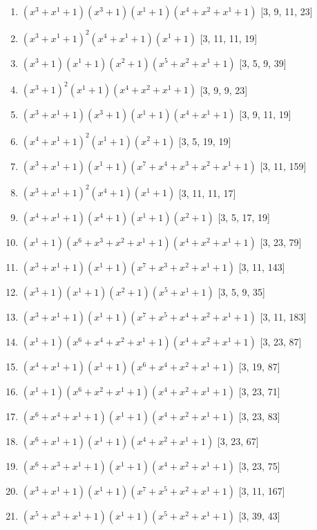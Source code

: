 \documentclass[10pt,twocolumn]{article}
\begin{document}
\begin{enumerate}
\item $(x^{3} + x^{1} + 1)(x^{3} + 1)(x^{1} + 1)(x^{4} + x^{2} + x^{1} + 1)$  [3, 9, 11, 23]
\item $(x^{3} + x^{1} + 1)^{2}(x^{4} + x^{1} + 1)(x^{1} + 1)$  [3, 11, 11, 19]
\item $(x^{3} + 1)(x^{1} + 1)(x^{2} + 1)(x^{5} + x^{2} + x^{1} + 1)$  [3, 5, 9, 39]
\item $(x^{3} + 1)^{2}(x^{1} + 1)(x^{4} + x^{2} + x^{1} + 1)$  [3, 9, 9, 23]
\item $(x^{3} + x^{1} + 1)(x^{3} + 1)(x^{1} + 1)(x^{4} + x^{1} + 1)$  [3, 9, 11, 19]
\item $(x^{4} + x^{1} + 1)^{2}(x^{1} + 1)(x^{2} + 1)$  [3, 5, 19, 19]
\item $(x^{3} + x^{1} + 1)(x^{1} + 1)(x^{7} + x^{4} + x^{3} + x^{2} + x^{1} + 1)$  [3, 11, 159]
\item $(x^{3} + x^{1} + 1)^{2}(x^{4} + 1)(x^{1} + 1)$  [3, 11, 11, 17]
\item $(x^{4} + x^{1} + 1)(x^{4} + 1)(x^{1} + 1)(x^{2} + 1)$  [3, 5, 17, 19]
\item $(x^{1} + 1)(x^{6} + x^{3} + x^{2} + x^{1} + 1)(x^{4} + x^{2} + x^{1} + 1)$  [3, 23, 79]
\item $(x^{3} + x^{1} + 1)(x^{1} + 1)(x^{7} + x^{3} + x^{2} + x^{1} + 1)$  [3, 11, 143]
\item $(x^{3} + 1)(x^{1} + 1)(x^{2} + 1)(x^{5} + x^{1} + 1)$  [3, 5, 9, 35]
\item $(x^{3} + x^{1} + 1)(x^{1} + 1)(x^{7} + x^{5} + x^{4} + x^{2} + x^{1} + 1)$  [3, 11, 183]
\item $(x^{1} + 1)(x^{6} + x^{4} + x^{2} + x^{1} + 1)(x^{4} + x^{2} + x^{1} + 1)$  [3, 23, 87]
\item $(x^{4} + x^{1} + 1)(x^{1} + 1)(x^{6} + x^{4} + x^{2} + x^{1} + 1)$  [3, 19, 87]
\item $(x^{1} + 1)(x^{6} + x^{2} + x^{1} + 1)(x^{4} + x^{2} + x^{1} + 1)$  [3, 23, 71]
\item $(x^{6} + x^{4} + x^{1} + 1)(x^{1} + 1)(x^{4} + x^{2} + x^{1} + 1)$  [3, 23, 83]
\item $(x^{6} + x^{1} + 1)(x^{1} + 1)(x^{4} + x^{2} + x^{1} + 1)$  [3, 23, 67]
\item $(x^{6} + x^{3} + x^{1} + 1)(x^{1} + 1)(x^{4} + x^{2} + x^{1} + 1)$  [3, 23, 75]
\item $(x^{3} + x^{1} + 1)(x^{1} + 1)(x^{7} + x^{5} + x^{2} + x^{1} + 1)$  [3, 11, 167]
\item $(x^{5} + x^{3} + x^{1} + 1)(x^{1} + 1)(x^{5} + x^{2} + x^{1} + 1)$  [3, 39, 43]

\end{enumerate}
\end{document}
